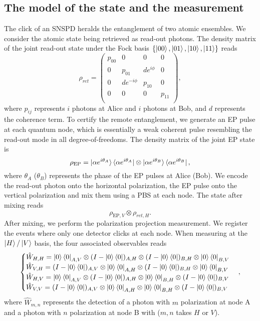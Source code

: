 \documentclass[aps,reprint,showpacs,superscriptaddress]{revtex4-2}
\begin{document}
\subsection{The model of the state and the measurement}
The click of an SNSPD heralds the entanglement of two atomic ensembles. We consider the atomic state being retrieved as read-out photons. The density matrix of the joint read-out state under the Fock basis $\{\ket{00}, \ket{01}, \ket{10}, \ket{11}\}$ reads~\cite{chou2005sm}
\begin{equation}
	\rho_{ret}=\left(\begin{matrix}
		p_{00}& 0& 0&0\\
		0& p_{01}& d e^{i\phi}&0\\
		0& de^{-i\phi}& p_{10}&0\\
		0& 0& 0&p_{11}\\
	\end{matrix}
	\right),
	\label{eq: density matrix}
\end{equation}
where $p_{ij}$ represents $i$ photons at Alice and $i$ photons at Bob, and $d$ represents the coherence term. To certify the remote entanglement, we generate an EP pulse at each quantum node, which is essentially a weak coherent pulse resembling the read-out mode in all degree-of-freedoms. The density matrix of the joint EP state is
\begin{equation}
	\rho_\textrm{EP}=\ket{\alpha e^{i\theta_A}}\bra{\alpha e^{i\theta_A}}\otimes\ket{\alpha e^{i\theta_B}}\bra{\alpha e^{i\theta_B}},
	\label{eq: density matrix 2}
\end{equation}
where $\theta_{A}$ ($\theta_{B}$) represents the phase of the EP pulses at Alice (Bob). We encode the read-out photon onto the horizontal polarization, the EP pulse onto the vertical polarization and mix them using a PBS at each node. The state after mixing reads
\begin{equation}
	\rho_{\textrm{EP},V}\otimes \rho_{ret,H}.
	\label{eq:EPxRE}
\end{equation}
After mixing, we perform the polarization projection measurement. We register the events where only one detector clicks at each node. When measuring at the $\ket{H}/\ket{V}$ basis, the four associated observables reads
\begin{equation}
	\begin{cases}
		\hat{W}_{H,H}=\ket{0}\bra{0}_{A,V}\otimes(I-\ket{0}\bra{0})_{A,H}\otimes(I-\ket{0}\bra{0})_{B,H}\otimes\ket{0}\bra{0}_{B,V}\\
		\hat{W}_{V,H}=(I-\ket{0}\bra{0})_{A,V}\otimes\ket{0}\bra{0}_{A,H}\otimes(I-\ket{0}\bra{0})_{B,H}\otimes\ket{0}\bra{0}_{B,V}\\
		\hat{W}_{H,V}=\ket{0}\bra{0}_{A,V}\otimes(I-\ket{0}\bra{0})_{A,H}\otimes\ket{0}\bra{0}_{B,H}\otimes(I-\ket{0}\bra{0})_{B,V}\\
		\hat{W}_{V,V}=(I-\ket{0}\bra{0})_{A,V}\otimes\ket{0}\bra{0}_{A,H}\otimes\ket{0}\bra{0}_{B,H}\otimes(I-\ket{0}\bra{0})_{B,V}\\
	\end{cases},
\end{equation}
 where $\hat{W}_{m,n}$ represents the detection of a photon with $m$ polarization at node A and a photon with $n$ polarization at node B with ($m,n$ takes $H$ or $V$). 
 
\end{document}
